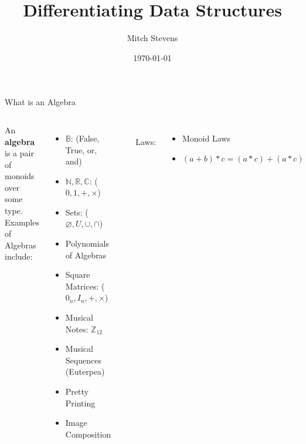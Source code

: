 \documentclass[10pt]{beamer}
\title{Differentiating Data Structures}
\date{\today}
\author{Mitch Stevens}
\begin{document}
\maketitle

\begin{frame}[fragile]{What is an Algebra}
	\begin{columns}[T,onlytextwidth]
 	An \textbf{algebra} is a pair of monoids over some type. \\
    
    Examples of Algebras include: \\
    \begin{itemize}
        \item $\mathbb{B}$: (False, True, or, and)
        \item $\mathbb{N}, \mathbb{R}, \mathbb{C}$: ($ 0, 1, +, \times $)
        \item Sets: ($ \varnothing, U, \cup, \cap $)
        \item Polynomials of Algebras
        \item Square Matrices: ($ 0_n, I_n, +, \times $)
        \item Musical Notes: $\mathbb{Z}_{12}$
        \item Musical Sequences (Euterpea)
        \item Pretty Printing
        \item Image Composition
    \end{itemize}

	\begin{lstlisting}[language=Haskell]
class Alg a where
  zero :: a
  one :: a
  (+) :: a -> a -> a
  (*) :: a -> a -> a
    \end{lstlisting} \\
    Laws: \\
    \begin{itemize}
        \item Monoid Laws
        \item $(a+b)*c = (a*c)+(a*c)$
    \end{itemize}

	\end{columns}
\end{frame}
\end{document}

